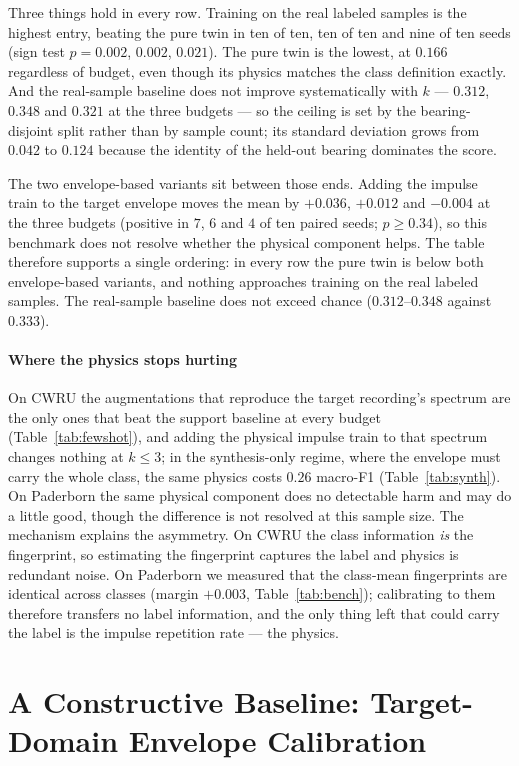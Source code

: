 \documentclass[preprint,12pt]{elsarticle}
\begin{document}
Three things hold in every row. Training on the real labeled samples is the
highest entry, beating the pure twin in ten of ten, ten of ten and nine of ten
seeds (sign test $p=0.002$, $0.002$, $0.021$). The pure twin is the lowest, at
$0.166$ regardless of budget, even though its physics matches the class
definition exactly. And the real-sample baseline does not improve systematically
with $k$ --- $0.312$, $0.348$ and $0.321$ at the three budgets --- so the
ceiling is set by the bearing-disjoint split rather than by sample count; its
standard deviation grows from $0.042$ to $0.124$ because the identity of the
held-out bearing dominates the score.

The two envelope-based variants sit between those ends. Adding the impulse
train to the target envelope moves the mean by $+0.036$, $+0.012$ and $-0.004$
at the three budgets (positive in $7$, $6$ and $4$ of ten paired seeds;
$p\ge 0.34$), so this benchmark does not resolve whether the physical component
helps. The table therefore supports a single ordering: in every row the pure
twin is below both envelope-based variants, and nothing approaches training on
the real labeled samples. The real-sample baseline does not exceed chance
($0.312$--$0.348$ against $0.333$).

\paragraph{Where the physics stops hurting}
On CWRU the augmentations that reproduce the target recording's spectrum are
the only ones that beat the support baseline at every budget
(Table~\ref{tab:fewshot}), and adding the physical impulse train to that
spectrum changes nothing at $k\le3$; in the synthesis-only regime, where the
envelope must carry the whole class, the same physics costs $0.26$ macro-F1
(Table~\ref{tab:synth}). On Paderborn the same physical component does no
detectable harm and may do a little good, though the difference is not resolved
at this sample size. The mechanism explains the asymmetry. On CWRU the
class information \emph{is} the fingerprint, so estimating the fingerprint
captures the label and physics is redundant noise. On Paderborn we measured
that the class-mean fingerprints are identical across classes (margin $+0.003$,
Table~\ref{tab:bench}); calibrating to them therefore transfers no label
information, and the only thing left that could carry the label is the impulse
repetition rate --- the physics.

\section{A Constructive Baseline: Target-Domain Envelope Calibration}
\label{sec:method}
\end{document}

